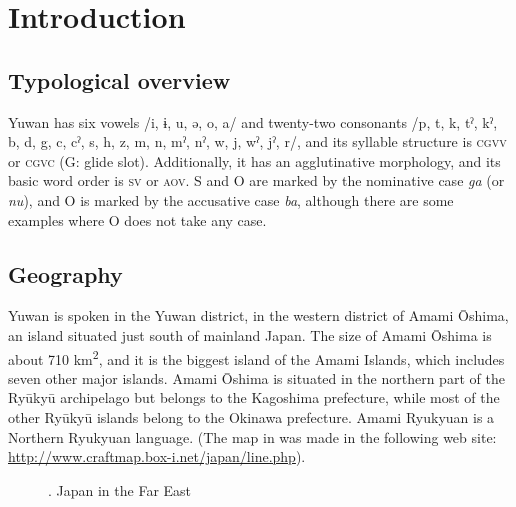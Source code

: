 \chapter{Introduction}\label{chap:1}
\hypertarget{RefHeadingToc395696949}{}
\section{Typological overview}
\hypertarget{RefHeadingToc395696950}{}
Yuwan has six vowels /i, ɨ, u, ə, o, a/ and twenty-two consonants /p, t, k, tˀ, kˀ, b, d, g, c, cˀ, s, h, z, m, n, mˀ, nˀ, w, j, wˀ, jˀ, r/, and its syllable structure is \textsc{cgvv} or \textsc{cgvc} (G: glide slot). Additionally, it has an agglutinative morphology, and its basic word order is \textsc{sv} or \textsc{aov}. S and O are marked by the nominative case \textit{ga} (or \textit{nu}), and O is marked by the accusative case \textit{ba}, although there are some examples where O does not take any case.

\section{Geography}
\hypertarget{RefHeadingToc395696951}{}
Yuwan is spoken in the Yuwan district, in the western district of Amami Ōshima, an island situated just south of mainland Japan. The size of Amami Ōshima is about 710 km\textsuperscript{2}, and it is the biggest island of the Amami Islands, which includes seven other major islands. Amami Ōshima is situated in the northern part of the Ryūkyū archipelago but belongs to the Kagoshima prefecture, while most of the other Ryūkyū islands belong to the Okinawa prefecture. Amami Ryukyuan is a Northern Ryukyuan language. (The map in  was made in the following web site: \url{http://www.craftmap.box-i.net/japan/line.php}).

  
 

\begin{figure}
\textmd{. Japan in the Far East}
\end{figure}

  
              
